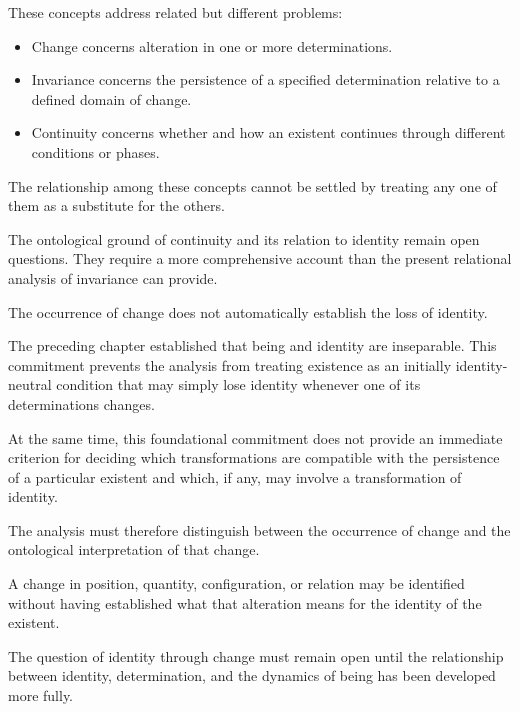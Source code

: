 These concepts address related but
different problems:

\begin{itemize}
    \item Change concerns alteration in
    one or more determinations.

    \item Invariance concerns the persistence
    of a specified determination relative
    to a defined domain of change.

    \item Continuity concerns whether and
    how an existent continues through
    different conditions or phases.
\end{itemize}

The relationship among these concepts
cannot be settled by treating any one
of them as a substitute for the others.

The ontological ground of continuity
and its relation to identity remain
open questions. They require a more
comprehensive account than the present
relational analysis of invariance can
provide.


The occurrence of change does not
automatically establish the loss of
identity.

The preceding chapter established
that being and identity are inseparable.
This commitment prevents the analysis
from treating existence as an initially
identity-neutral condition that may
simply lose identity whenever one of
its determinations changes.

At the same time, this foundational
commitment does not provide an immediate
criterion for deciding which transformations
are compatible with the persistence
of a particular existent and which,
if any, may involve a transformation
of identity.

The analysis must therefore distinguish
between the occurrence of change and
the ontological interpretation of that
change.

A change in position, quantity, configuration,
or relation may be identified without
having established what that alteration
means for the identity of the existent.

The question of identity through change
must remain open until the relationship
between identity, determination, and
the dynamics of being has been developed
more fully.

